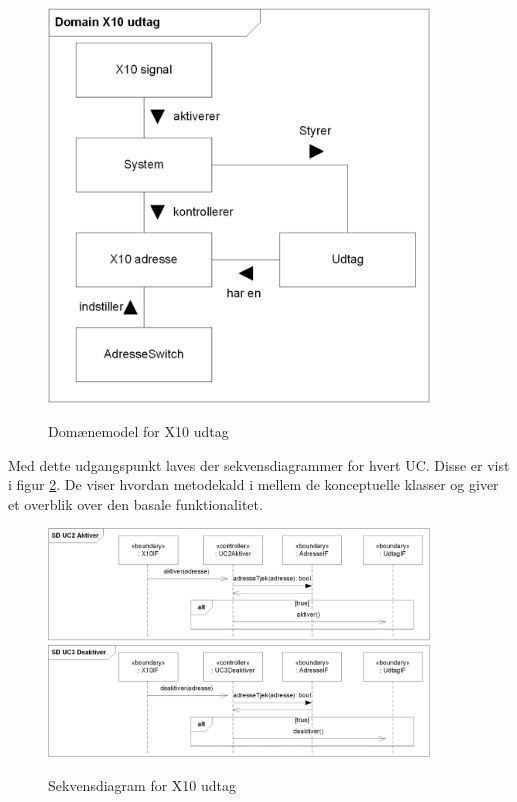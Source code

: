 \begin{figure}[!htb]
     \centering
     { \includegraphics[width=0.9\textwidth]{Billeder/UML/X10_modtager_Domain}}
     \caption{Domænemodel for X10 udtag}
     \label{fig:X10_udtag_domaenemodel}
\end{figure}

Med dette udgangspunkt laves der sekvensdiagrammer for hvert UC. Disse er vist i figur \ref{fig:X10_udtag_sd}. De viser hvordan metodekald i mellem de konceptuelle klasser og giver et overblik over den basale funktionalitet.

\begin{figure}[!htb]
     \centering
     { \includegraphics[width=0.9\textwidth]{Billeder/UML/X10_modtager_SD}}
     \caption{Sekvensdiagram for X10 udtag}
     \label{fig:X10_udtag_sd}
\end{figure}

